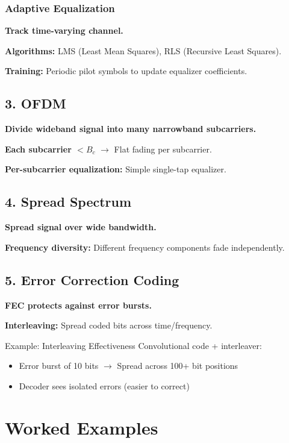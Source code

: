 \subsubsection{Adaptive Equalization}

\textbf{Track time-varying channel.}

\textbf{Algorithms:} LMS (Least Mean Squares), RLS (Recursive Least Squares).

\textbf{Training:} Periodic pilot symbols to update equalizer coefficients.

\subsection{3. OFDM}

\textbf{Divide wideband signal into many narrowband subcarriers.}

\textbf{Each subcarrier $< B_c$} $\rightarrow$ Flat fading per subcarrier.

\textbf{Per-subcarrier equalization:} Simple single-tap equalizer.

\subsection{4. Spread Spectrum}

\textbf{Spread signal over wide bandwidth.}

\textbf{Frequency diversity:} Different frequency components fade independently.

\subsection{5. Error Correction Coding}

\textbf{FEC protects against error bursts.}

\textbf{Interleaving:} Spread coded bits across time/frequency.

\begin{calloutbox}{Example: Interleaving Effectiveness}
Convolutional code + interleaver:
\begin{itemize}
\item Error burst of 10 bits $\rightarrow$ Spread across 100+ bit positions
\item Decoder sees isolated errors (easier to correct)
\end{itemize}
\end{calloutbox}

\section{Worked Examples}


